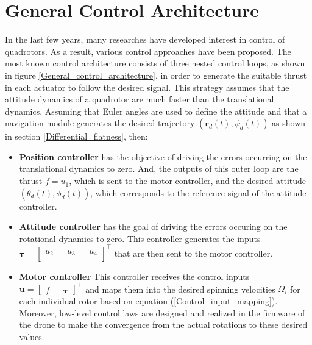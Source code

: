 \documentclass{thesisreport}
\begin{document}
\newpage 
 
 \section{General Control Architecture}
 In the last few years, many researches have developed interest in control of quadrotors. As a result, various control approaches have been proposed. The most known control architecture \cite{Faessler2018} consists of three nested control loops, as shown in figure \ref{General_control_architecture}, in order to generate the suitable thrust in each actuator to follow the desired signal. This strategy assumes that the attitude dynamics of a quadrotor are much faster than the translational dynamics. Assuming that Euler angles are used to define the attitude and that a navigation module generates the desired trajectory $(\bm{r}_d(t),\psi_d(t))$ as shown in section \ref{Differential_flatness}, then:
 
\begin{itemize}
	\setlength{\itemindent}{-.5in}
	\item [] \textbf{Position controller} has the objective of driving the errors occurring on the translational dynamics to zero.
		And, the outputs of this outer loop are the thrust $f=u_1$, which is sent to the motor controller, and the desired attitude $(\theta_d(t),\phi_d(t))$, which corresponds to the reference signal of the attitude controller.
	\item [] \textbf{Attitude controller} has the goal of driving the errors occuring on the rotational dynamics to zero. This controller generates the inputs 
	$\bm{\tau}=\begin{bmatrix}
	u_2 && u_3 && u_4 \\
	\end{bmatrix}^{\intercal}
	$
	that are then sent to the motor controller.
	\item [] \textbf{Motor controller} This controller receives the control inputs 	$\bm{u}=\begin{bmatrix}
	f && \bm{\tau}
	\end{bmatrix}^{\intercal}
	$ and maps them into the desired spinning velocities $\Omega_i$ for each individual rotor based on equation (\ref{Control_input_mapping}). Moreover, low-level control laws are designed and realized in the firmware of the drone to make the convergence from the actual rotations to these desired values.
\end{itemize}
 
\end{document}
